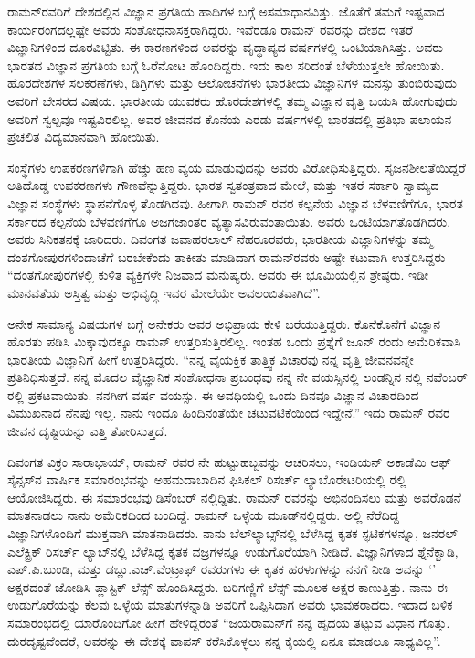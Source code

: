 
ರಾಮನ್‍ರವರಿಗೆ ದೇಶದಲ್ಲಿನ ವಿಜ್ಞಾನ ಪ್ರಗತಿಯ ಹಾದಿಗಳ ಬಗ್ಗೆ ಅಸಮಾಧಾನವಿತ್ತು. ಜೊತೆಗೆ ತಮಗೆ ಇಷ್ಟವಾದ ಕಾರ್ಯರಂಗದಲ್ಲಷ್ಟೇ ಅವರು ಸಂಶೋಧನಾಸಕ್ತರಾಗಿದ್ದರು. ಇವೆರಡೂ ರಾಮನ್ ರವರನ್ನು ದೇಶದ ಇತರೆ ವಿಜ್ಞಾನಿಗಳಿಂದ ದೂರವಿಟ್ಟಿತು. ಈ ಕಾರಣಗಳಿಂದ ಅವರನ್ನು ವೃದ್ಧಾಪ್ಯದ ವರ್ಷಗಳಲ್ಲಿ ಒಂಟಿಯಾಗಿಸಿತ್ತು. ಅವರು ಭಾರತದ ವಿಜ್ಞಾನ ಪ್ರಗತಿಯ ಬಗ್ಗೆ ಓರೆನೋಟ ಹೊಂದಿದ್ದರು. ಇದು ಕಾಲ ಸರಿದಂತೆ ಬೆಳೆಯುತ್ತಲೇ ಹೋಯಿತು. ಹೊರದೇಶಗಳ ಸಲಕರಣೆಗಳು, ಡಿಗ್ರಿಗಳು ಮತ್ತು ಆಲೋಚನೆಗಳು ಭಾರತೀಯ ವಿಜ್ಞಾನಿಗಳ ಮನಸ್ಸು ತುಂಬಿರುವುದು ಅವರಿಗೆ ಬೇಸರದ ವಿಷಯ. ಭಾರತೀಯ ಯುವಕರು ಹೊರದೇಶಗಳಲ್ಲಿ ತಮ್ಮ ವಿಜ್ಞಾನ ವೃತ್ತಿ ಬಯಸಿ ಹೋಗುವುದು ಅವರಿಗೆ ಸ್ವಲ್ಪವೂ ಇಷ್ಟವಿರಲಿಲ್ಲ. ಅವರ ಜೀವನದ ಕೊನೆಯ ಎರಡು ವರ್ಷಗಳಲ್ಲಿ ಭಾರತದಲ್ಲಿ ಪ್ರತಿಭಾ ಪಲಾಯನ ಪ್ರಚಲಿತ ವಿದ್ಯಮಾನವಾಗಿ ಹೋಯಿತು.

ಸಂಸ್ಥೆಗಳು ಉಪಕರಣಗಳಿಗಾಗಿ ಹೆಚ್ಚು ಹಣ ವ್ಯಯ ಮಾಡುವುದನ್ನು ಅವರು ವಿರೋಧಿಸುತ್ತಿದ್ದರು. ಸೃಜನಶೀಲತೆಯಿದ್ದರೆ ಅತಿದೊಡ್ಡ ಉಪಕರಣಗಳು ಗೌಣವೆನ್ನುತ್ತಿದ್ದರು. ಭಾರತ ಸ್ವತಂತ್ರವಾದ ಮೇಲೆ,  ಮತ್ತು ಇತರೆ ಸರ್ಕಾರಿ ಸ್ವಾಮ್ಯದ ವಿಜ್ಞಾನ ಸಂಸ್ಥೆಗಳು ಸ್ಥಾಪನೆಗೊಳ್ಳ ತೊಡಗಿದವು. ಹೀಗಾಗಿ ರಾಮನ್ ರವರ ಕಲ್ಪನೆಯ ವಿಜ್ಞಾನ ಬೆಳವಣಿಗೆಗೂ, ಭಾರತ ಸರ್ಕಾರದ ಕಲ್ಪನೆಯ ಬೆಳವಣಿಗೆಗೂ ಅಜಗಜಾಂತರ ವ್ಯತ್ಯಾಸವಿರುವಂತಾಯಿತು. ಅವರು ಒಂಟಿಯಾಗತೊಡಗಿದರು. ಅವರು ಸಿನಿಕತನಕ್ಕೆ ಜಾರಿದರು. ದಿವಂಗತ ಜವಾಹರಲಾಲ್ ನೆಹರೂ\-ರವರು, ಭಾರತೀಯ ವಿಜ್ಞಾನಿಗಳನ್ನು ತಮ್ಮ ದಂತಗೋಪುರಗಳಿಂದಾಚೆಗೆ ಬರಬೇಕೆಂದು ತಾಕೀತು ಮಾಡಿದಾಗ ರಾಮನ್‍ರವರು ಅಷ್ಟೇ ಕಟುವಾಗಿ ಉತ್ತರಿಸಿದ್ದರು \enginline{-} “ದಂತಗೋಪುರಗಳಲ್ಲಿ ಕುಳಿತ ವ್ಯಕ್ತಿಗಳೇ ನಿಜವಾದ ಮನುಷ್ಯರು. ಅವರು ಈ ಭೂಮಿಯಲ್ಲಿನ ಶ್ರೇಷ್ಠರು. ಇಡೀ ಮಾನವತೆಯ ಅಸ್ತಿತ್ವ ಮತ್ತು ಅಭಿವೃದ್ಧಿ ಇವರ ಮೇಲೆಯೇ ಅವಲಂಬಿತವಾಗಿದೆ”.

\newpage

ಅನೇಕ ಸಾಮಾನ್ಯ ವಿಷಯಗಳ ಬಗ್ಗೆ ಅನೇಕರು ಅವರ ಅಭಿಪ್ರಾಯ ಕೇಳಿ ಬರೆಯುತ್ತಿದ್ದರು. ಕೊನೆಕೊನೆಗೆ ವಿಜ್ಞಾನ ಹೊರತು ಪಡಿಸಿ ಮಿಕ್ಕಾವುದಕ್ಕೂ ರಾಮನ್ ಉತ್ತರಿಸುತ್ತಿರಲಿಲ್ಲ. ಇಂತಹ ಒಂದು ಪ್ರಶ್ನೆಗೆ ಜೂನ್  ರಂದು ಅಮೆರಿಕವಾಸಿ ಭಾರತೀಯ ವಿಜ್ಞಾನಿಗೆ ಹೀಗೆ ಉತ್ತರಿಸಿದ್ದರು.\enginline{-} “ನನ್ನ ವೈಯಕ್ತಿಕ ತಾತ್ತ್ವಿಕ ವಿಚಾರವು ನನ್ನ ವೃತ್ತಿ ಜೀವನವನ್ನೇ ಪ್ರತಿನಿಧಿಸುತ್ತದೆ. ನನ್ನ ಮೊದಲ ವೈಜ್ಞಾನಿಕ ಸಂಶೋಧನಾ ಪ್ರಬಂಧವು ನನ್ನ ನೇ ವಯಸ್ಸಿನಲ್ಲಿ ಲಂಡನ್ನಿನ \textit{} ನಲ್ಲಿ ನವೆಂಬರ್ ರಲ್ಲಿ ಪ್ರಕಟವಾಯಿತು. ನನಗೀಗ  ವರ್ಷ ವಯಸ್ಸು. ಈ ಅವಧಿಯಲ್ಲಿ ಒಂದು ದಿನವೂ ವಿಜ್ಞಾನ ವಿಚಾರದಿಂದ ವಿಮುಖನಾದ ನೆನಪು ಇಲ್ಲ. ನಾನು ಇಂದೂ ಹಿಂದಿನಂತೆಯೇ ಚಟುವಟಿಕೆಯಿಂದ ಇದ್ದೇನೆ.” ಇದು ರಾಮನ್ ರವರ ಜೀವನ ದೃಷ್ಟಿಯನ್ನು ಎತ್ತಿ ತೋರಿಸುತ್ತದೆ.

ದಿವಂಗತ ವಿಕ್ರಂ ಸಾರಾಭಾಯ್, ರಾಮನ್ ರವರ ನೇ ಹುಟ್ಟುಹಬ್ಬವನ್ನು ಆಚರಿಸಲು, ಇಂಡಿಯನ್ ಅಕಾಡೆಮಿ ಆಫ್ ಸೈನ್ಸಸ್‍ನ ವಾರ್ಷಿಕ ಸಮಾರಂಭವನ್ನು ಅಹಮದಾಬಾದಿನ ಫಿಸಿಕಲ್ ರಿಸರ್ಚ್ ಲ್ಯಾಬೊರೇಟರಿಯಲ್ಲಿ ರಲ್ಲಿ ಆಯೋಜಿಸಿದ್ದರು. ಈ ಸಮಾರಂಭವು ಡಿಸೆಂಬರ್ ನಲ್ಲಿದ್ದಿತು. ರಾಮನ್ ರವರನ್ನು ಅಭಿನಂದಿಸಲು ಮತ್ತು ಅವರೊಡನೆ ಮಾತನಾಡಲು ನಾನು ಅಮೆರಿಕದಿಂದ ಬಂದಿದ್ದೆ. ರಾಮನ್ ಒಳ್ಳೆಯ ಮೂಡ್‍ನಲ್ಲಿದ್ದರು. ಅಲ್ಲಿ ನೆರೆದಿದ್ದ ವಿಜ್ಞಾನಿಗಳೊಂದಿಗೆ ಮುಕ್ತವಾಗಿ ಮಾತನಾಡಿದರು. ನಾನು ಬೆಲ್‍ಲ್ಯಾಬ್ಸ್‌ನಲ್ಲಿ ಬೆಳೆಸಿದ್ದ ಕೃತಕ ಸ್ಫಟಿಕಗಳನ್ನೂ, ಜನರಲ್ ಎಲೆಕ್ಟ್ರಿಕ್ ರಿಸರ್ಚ್ ಲ್ಯಾಬ್‍ನಲ್ಲಿ ಬೆಳೆಸಿದ್ದ ಕೃತಕ ವಜ್ರಗಳನ್ನೂ ಉಡುಗೊರೆಯಾಗಿ ನೀಡಿದೆ. ವಿಜ್ಞಾನಿಗಳಾದ ಶ್ನೆನೆಕ್ವಾಡಿ, ಎಪ್.ಪಿ.ಬುಂಡಿ, ಮತ್ತು ಡಬ್ಲು.ಎಚ್.ವೆಂಟ್ರಾಫ್ ರವರುಗಳು ಈ ಕೃತಕ ಹರಳುಗಳನ್ನು ನನಗೆ ನೀಡಿ ಅವನ್ನು ‘’ ಅಕ್ಷರದಂತೆ ಜೋಡಿಸಿ ಪ್ಲಾಸ್ಟಿಕ್ ಲೆನ್ಸ್ ಹೊಂದಿಸಿದ್ದರು. ಬರಿಗಣ್ಣಿಗೆ ಲೆನ್ಸ್ ಮೂಲಕ ಅಕ್ಷರ ಕಾಣುತ್ತಿತ್ತು. ನಾನು ಈ ಉಡುಗೊರೆಯನ್ನು ಕೆಲವು ಒಳ್ಳೆಯ ಮಾತುಗಳನ್ನಾಡಿ ಅವರಿಗೆ ಒಪ್ಪಿಸಿದಾಗ ಅವರು ಭಾವುಕರಾದರು. ಇದಾದ ಬಳಿಕ ಸಮಾರಂಭದಲ್ಲಿ ಯಾರೊಂದಿಗೋ ಹೀಗೆ ಹೇಳಿದ್ದರಂತೆ\enginline{-} “ಜಯರಾಮನ್‍ಗೆ ನನ್ನ ಹೃದಯ ತಟ್ಟುವ ವಿಧಾನ ಗೊತ್ತು. ದುರದೃಷ್ಟವೆಂದರೆ, ಅವರನ್ನು ಈ ದೇಶಕ್ಕೆ ವಾಪಸ್ ಕರೆಸಿಕೊಳ್ಳಲು ನನ್ನ ಕೈಯಲ್ಲಿ ಏನೂ ಮಾಡಲೂ ಸಾಧ್ಯವಿಲ್ಲ”.

